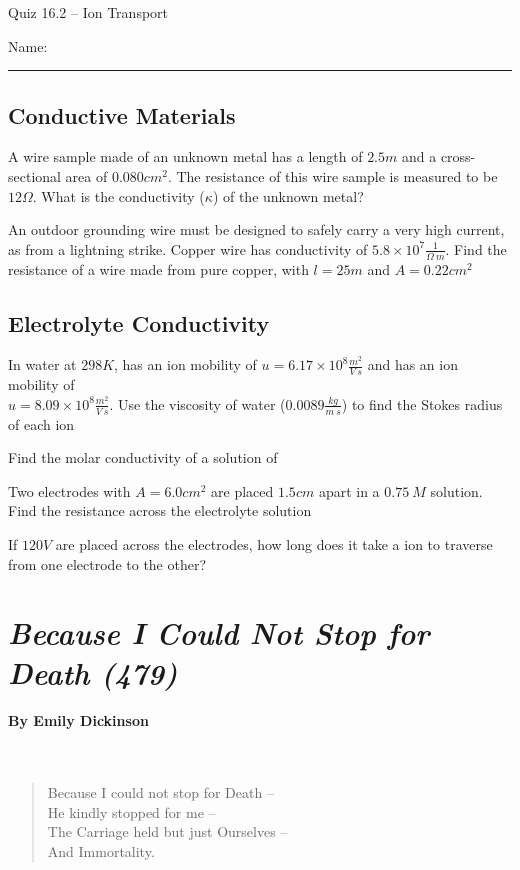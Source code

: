 \documentclass[11pt, letterpaper]{memoir}
\begin{document}
	\begin{center}
		{\large Quiz 16.2 -- Ion Transport}
	\end{center}
	{\large Name: \rule[-1mm]{4in}{.1pt} 


\subsection*{Conductive Materials}
A wire sample made of an unknown metal has a length of $2.5m$ and a cross-sectional area of $0.080cm^2$. The resistance of this wire sample is measured to be $12\Omega$. What is the conductivity ($\kappa$) of the unknown metal?

\vspace{4em}\noindent
An outdoor grounding wire must be designed to safely carry a very high current, as from a lightning strike. Copper wire has conductivity of $5.8\times10^7\frac{1}{\Omega~m}$. Find the resistance of a wire made from pure copper, with $l=25m$ and $A=0.22cm^2$

\vspace{4em}
\subsection*{Electrolyte Conductivity}
In water at $298K$,  has an ion mobility of $u=6.17\times10^{8}\frac{m^2}{V~s}$ and  has an ion mobility of \\$u=8.09\times10^{8}\frac{m^2}{V~s}$. Use the viscosity of water ($0.0089\frac{kg}{m~s}$) to find the Stokes radius of each ion

\vspace{5em}\noindent
Find the molar conductivity of a solution of 

\vspace{4em}\noindent
Two electrodes with $A=6.0cm^2$ are placed $1.5cm$ apart in a $0.75~M$  solution. Find the resistance across the electrolyte solution

\vspace{6em}\noindent
If $120V$ are placed across the electrodes, how long does it take a  ion to traverse from one electrode to the other?


\newpage
\pagestyle{empty}
\addtocounter{page}{-1}	
\section*{\emph{Because I Could Not Stop for Death (479)}}
\paragraph{By Emily Dickinson}~
\begin{verse}
	Because I could not stop for Death –\\
	He kindly stopped for me –\\
	The Carriage held but just Ourselves –\\
	And Immortality.
	

\end{verse}}
\end{document}

